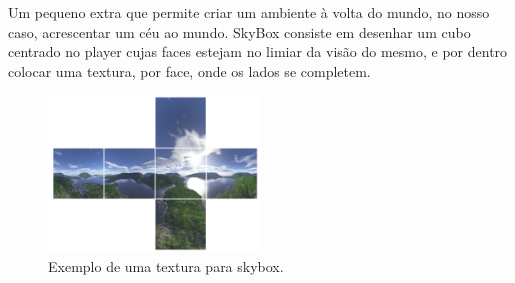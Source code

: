 
Um pequeno extra que permite criar um ambiente à volta do mundo, no nosso caso, acrescentar um céu ao mundo. SkyBox consiste em desenhar um cubo centrado no player cujas faces estejam no limiar da visão do mesmo, e por dentro colocar uma textura, por face, onde os lados se completem.

\-

\begin{figure}[h]
\begin{center}
\includegraphics[width=0.5\textwidth]{images/skybox.png}
\caption{Exemplo de uma textura para skybox.}
\end{center}
\end{figure}
